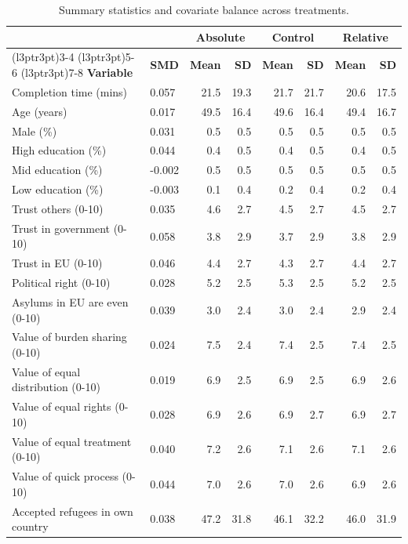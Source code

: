\documentclass[
  12pt,
  a4paper,
]{article}
\begin{document}
\begin{table}
\centering
\caption{\label{tab:summary}Summary statistics and covariate balance across treatments.}
\centering
\begin{tabular}[t]{llrrrrrr}
\toprule
\multicolumn{2}{c}{\textbf{ }} & \multicolumn{2}{c}{\textbf{Absolute}} & \multicolumn{2}{c}{\textbf{Control}} & \multicolumn{2}{c}{\textbf{Relative}} \\
\cmidrule(l{3pt}r{3pt}){3-4} \cmidrule(l{3pt}r{3pt}){5-6} \cmidrule(l{3pt}r{3pt}){7-8}
\textbf{Variable} & \textbf{SMD} & \textbf{Mean} & \textbf{SD} & \textbf{Mean} & \textbf{SD} & \textbf{Mean} & \textbf{SD}\\
\midrule
Completion time (mins) & 0.057 & 21.5 & 19.3 & 21.7 & 21.7 & 20.6 & 17.5\\
Age (years) & 0.017 & 49.5 & 16.4 & 49.6 & 16.4 & 49.4 & 16.7\\
Male (\%) & 0.031 & 0.5 & 0.5 & 0.5 & 0.5 & 0.5 & 0.5\\
High education (\%) & 0.044 & 0.4 & 0.5 & 0.4 & 0.5 & 0.4 & 0.5\\
Mid education (\%) & -0.002 & 0.5 & 0.5 & 0.5 & 0.5 & 0.5 & 0.5\\
\addlinespace
Low education (\%) & -0.003 & 0.1 & 0.4 & 0.2 & 0.4 & 0.2 & 0.4\\
Trust others (0-10) & 0.035 & 4.6 & 2.7 & 4.5 & 2.7 & 4.5 & 2.7\\
Trust in government (0-10) & 0.058 & 3.8 & 2.9 & 3.7 & 2.9 & 3.8 & 2.9\\
Trust in EU (0-10) & 0.046 & 4.4 & 2.7 & 4.3 & 2.7 & 4.4 & 2.7\\
Political right (0-10) & 0.028 & 5.2 & 2.5 & 5.3 & 2.5 & 5.2 & 2.5\\
\addlinespace
Asylums in EU are even (0-10) & 0.039 & 3.0 & 2.4 & 3.0 & 2.4 & 2.9 & 2.4\\
Value of burden sharing (0-10) & 0.024 & 7.5 & 2.4 & 7.4 & 2.5 & 7.4 & 2.5\\
Value of equal distribution (0-10) & 0.019 & 6.9 & 2.5 & 6.9 & 2.5 & 6.9 & 2.6\\
Value of equal rights (0-10) & 0.028 & 6.9 & 2.6 & 6.9 & 2.7 & 6.9 & 2.7\\
Value of equal treatment (0-10) & 0.040 & 7.2 & 2.6 & 7.1 & 2.6 & 7.1 & 2.6\\
\addlinespace
Value of quick process (0-10) & 0.044 & 7.0 & 2.6 & 7.0 & 2.6 & 6.9 & 2.6\\
Accepted refugees in own country & 0.038 & 47.2 & 31.8 & 46.1 & 32.2 & 46.0 & 31.9\\

\end{tabular}
\end{table}
\end{document}
